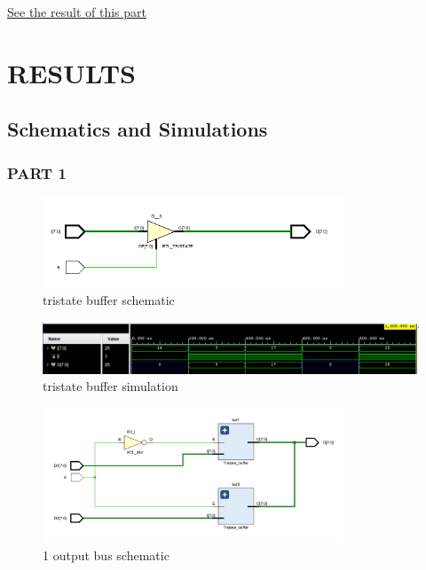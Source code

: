 \documentclass[pdftex,12pt,a4paper]{article}
\begin{document}
\hyperlink{hype6}{See the result of this part}

\section{RESULTS}
\subsection{Schematics and Simulations}


\hypertarget{hype1}{}
\subsubsection{PART 1}


    \begin{figure}[H]
    	\centering
    	\includegraphics[width=0.8\textwidth]{schematic/buffer_schem.png}	
    	\caption{tristate buffer schematic}
    	\label{tristate buffer schematic}
    \end{figure}
    
    \begin{figure}[H]
    	\centering
    	\includegraphics[width=1\textwidth]{simulations/buffer_sim.png}	
    	\caption{tristate buffer simulation}
    	\label{tristate buffer simulation}
    \end{figure}
    
    \begin{figure}[H]
    	\centering
    	\includegraphics[width=0.8\textwidth]{schematic/bus_schem.png}	
    	\caption{1 output bus schematic}
    	\label{1 output bus schematic}
    \end{figure}
    
\end{document}
